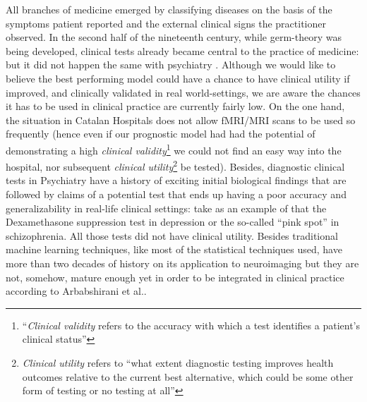 \documentclass[a4paper,12pt]{elsarticle}  %
\begin{document}
	All branches of medicine emerged by classifying diseases on the basis of the symptoms patient reported and the external clinical signs the practitioner observed. In the second half of the nineteenth century, while germ-theory was being developed, clinical tests already became central to the practice of medicine: but it did not happen the same with psychiatry \cite{Kapur20121174}. Although we would like to believe the best performing model could have a chance to have clinical utility if improved, and clinically validated in real world-settings, we are aware the chances it has to be used in clinical practice are currently fairly low. On the one hand, the situation in Catalan Hospitals does not allow fMRI/MRI scans to be used so frequently (hence even if our prognostic model had had the potential of demonstrating a high \textit{clinical validity}\footnote{``\textit{Clinical validity} refers to the accuracy with which a test identifies a patient’s clinical status''\cite{Burke2014}} we could not find an easy way into the hospital, nor subsequent \textit{clinical utility}\footnote{\textit{Clinical utility} refers to ``what extent diagnostic testing improves health outcomes relative to the current best alternative, which could be some other form of testing or no testing at all''\cite{Bossuyt20121636}} be tested). Besides, diagnostic clinical tests in Psychiatry have a history of exciting initial biological findings that are followed by claims of a potential test that ends up having a poor accuracy and generalizability in real-life clinical settings\cite{Kapur20121174}: take as an example of that the Dexamethasone suppression test in depression \cite{Gold19801190} or the so-called ``pink spot'' in schizophrenia. All those tests did not have clinical utility. Besides traditional machine learning techniques, like most of the statistical techniques used, have more than two decades of history on its application to neuroimaging but they are not, somehow, mature enough yet in order to be integrated in clinical practice according to Arbabshirani et al.\cite{Arbabshirani2017137}.
	
	
\end{document}
